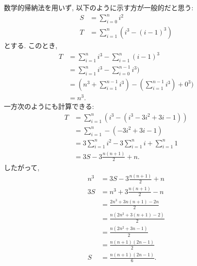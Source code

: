\begin{rem}
  数学的帰納法を用いず, 以下のように示す方が一般的だと思う:
  \begin{align*}
    S&=\sum_{i=0}^n i^2\\
    T&=\sum_{i=1}^{n}(i^3-(i-1)^3)
  \end{align*}
  とする.
  このとき,
  \begin{align*}
    T&=\sum_{i=1}^{n}i^3-\sum_{i=1}^n (i-1)^3\\
    &=\sum_{i=1}^{n}i^3-\sum_{i=0}^{n-1} i^3)\\
    &=(n^3+\sum_{i=1}^{n-1}i^3)-(\sum_{i=1}^{n-1} i^3)+0^3)\\
    &=n^3.
  \end{align*}
  一方次のようにも計算できる:
  \begin{align*}
    T
    &=\sum_{i=1}^{n}(i^3- (i^3-3i^2+3i-1))\\
    &=\sum_{i=1}^{n}-(-3i^2+3i-1)\\
    &=3\sum_{i=1}^{n}i^2-3\sum_{i=1}^{n}i+\sum_{i=1}^{n}1\\
    &=3S-3\frac{n(n+1)}{2}+n.
  \end{align*}
  したがって,
  \begin{align*}
    n^3&=3S-3\frac{n(n+1)}{2}+n\\
    3S&=n^3+3\frac{n(n+1)}{2}-n\\
    &=\frac{2n^3+3n(n+1)-2n}{2}\\
    &=\frac{n(2n^2+3(n+1)-2)}{2}\\
    &=\frac{n(2n^2+3n-1)}{2}\\
    &=\frac{n(n+1)(2n-1)}{2}\\
    S&=\frac{n(n+1)(2n-1)}{6}.
  \end{align*}
\end{rem}

